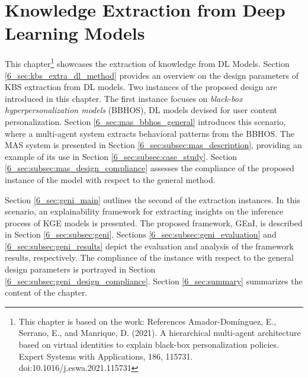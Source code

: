 \chapter{Knowledge Extraction from Deep Learning Models}
\label{chap:kbsextractiondl}
This chapter\footnote{This chapter is based on the work: References
Amador-Domínguez, E., Serrano, E., and Manrique, D. (2021). A hierarchical multi-agent architecture based on virtual identities to explain black-box personalization policies. Expert Systems with Applications, 186, 115731. doi:10.1016/j.eswa.2021.115731} showcases the extraction of knowledge from DL Models. Section \ref{6_sec:kbs_extra_dl_method} provides an overview on the design parameters of KBS extraction from DL models. Two instances of the proposed design are introduced in this chapter. The first instance focuses on \textit{black-box hyperpersonalization models} (BBHOS), DL models devised for user content personalization. Section \ref{6_sec:mas_bbhos_general} introduces this scenario, where a multi-agent system extracts behavioral patterns from the BBHOS. The MAS system is presented in Section \ref{6_sec:subsec:mas_description}, providing an example of its use in Section \ref{6_sec:subsec:case_study}. Section \ref{6_sec:subsec:mas_design_compliance} assesses the compliance of the proposed instance of the model with respect to the general method. 

Section \ref{6_sec:geni_main} outlines the second of the extraction instances. In this scenario, an explainability framework for extracting insights on the inference process of KGE models is presented. The proposed framework, GEnI, is described in Section \ref{6_sec:subsec:geni}. Sections \ref{6_sec:subsec:geni_evaluation} and \ref{6_sec:subsec:geni_results} depict the evaluation and analysis of the framework results, respectively. The compliance of the instance with respect to the general design parameters is portrayed in Section \ref{6_sec:subsec:geni_design_compliance}. Section \ref{6_sec:summary} summarizes the content of the chapter.


